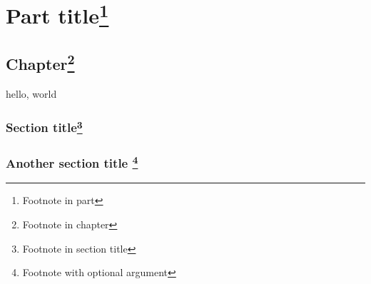 \documentclass{amsbook}
\begin{document}
\frontmatter

\tableofcontents

\mainmatter

\part{Part title\footnote{Footnote in part}}

\chapter{Chapter\footnote{Footnote in chapter}}

hello, world

\section{Section title\footnote{Footnote in section title}}

\section{Another section title \footnote[3]{Footnote with optional argument}}
\end{document}
